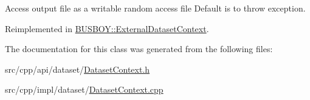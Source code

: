 Access output file as a writable random access file Default is to throw exception. 

Reimplemented in \hyperlink{classBUSBOY_1_1ExternalDatasetContext_a6f81aca310286df497632e916e555bee}{BUSBOY::ExternalDatasetContext}.

The documentation for this class was generated from the following files:\begin{DoxyCompactItemize}
\item 
src/cpp/api/dataset/\hyperlink{DatasetContext_8h}{DatasetContext.h}\item 
src/cpp/impl/dataset/\hyperlink{DatasetContext_8cpp}{DatasetContext.cpp}\end{DoxyCompactItemize}
